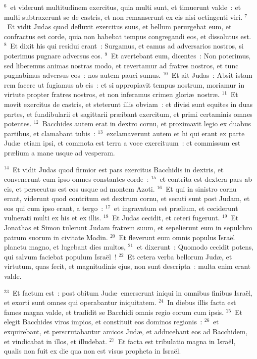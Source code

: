 ${}^{6}$~et viderunt multitudinem exercitus, quia multi sunt, et timuerunt valde~: et multi subtraxerunt se de castris, et non remanserunt ex eis nisi octingenti viri.
${}^{7}$~Et vidit Judas quod defluxit exercitus suus, et bellum perurgebat eum, et confractus est corde, quia non habebat tempus congregandi eos, et dissolutus est.
${}^{8}$~Et dixit his qui residui erant~: Surgamus, et eamus ad adversarios nostros, si poterimus pugnare adversus eos.
${}^{9}$~Et avertebant eum, dicentes~: Non poterimus, sed liberemus animas nostras modo, et revertamur ad fratres nostros, et tunc pugnabimus adversus eos~: nos autem pauci sumus.
${}^{10}$~Et ait Judas~: Absit istam rem facere ut fugiamus ab eis~: et si appropiavit tempus nostrum, moriamur in virtute propter fratres nostros, et non inferamus crimen glori\ae\ nostr\ae .
${}^{11}$~Et movit exercitus de castris, et steterunt illis obviam~: et divisi sunt equites in duas partes, et fundibularii et sagittarii pr\ae ibant exercitum, et primi certaminis omnes potentes.
${}^{12}$~Bacchides autem erat in dextro cornu, et proximavit legio ex duabus partibus, et clamabant tubis~:
${}^{13}$~exclamaverunt autem et hi qui erant ex parte Jud\ae\ etiam ipsi, et commota est terra a voce exercituum~: et commissum est pr\ae lium a mane usque ad vesperam.


${}^{14}$~Et vidit Judas quod firmior est pars exercitus Bacchidis in dextris, et convenerunt cum ipso omnes constantes corde~:
${}^{15}$~et contrita est dextera pars ab eis, et persecutus est eos usque ad montem Azoti.
${}^{16}$~Et qui in sinistro cornu erant, viderunt quod contritum est dextrum cornu, et secuti sunt post Judam, et eos qui cum ipso erant, a tergo~:
${}^{17}$~et ingravatum est pr\ae lium, et ceciderunt vulnerati multi ex his et ex illis.
${}^{18}$~Et Judas cecidit, et ceteri fugerunt.
${}^{19}$~Et Jonathas et Simon tulerunt Judam fratrem suum, et sepelierunt eum in sepulchro patrum suorum in civitate Modin.
${}^{20}$~Et fleverunt eum omnis populus Isra\"el planctu magno, et lugebant dies multos,
${}^{21}$~et dixerunt~: Quomodo cecidit potens, qui salvum faciebat populum Isra\"el~!
${}^{22}$~Et cetera verba bellorum Jud\ae , et virtutum, quas fecit, et magnitudinis ejus, non sunt descripta~: multa enim erant valde.


${}^{23}$~Et factum est~: post obitum Jud\ae\ emerserunt iniqui in omnibus finibus Isra\"el, et exorti sunt omnes qui operabantur iniquitatem.
${}^{24}$~In diebus illis facta est fames magna valde, et tradidit se Bacchidi omnis regio eorum cum ipsis.
${}^{25}$~Et elegit Bacchides viros impios, et constituit eos dominos regionis~:
${}^{26}$~et exquirebant, et perscrutabantur amicos Jud\ae , et adducebant eos ad Bacchidem, et vindicabat in illos, et illudebat.
${}^{27}$~Et facta est tribulatio magna in Isra\"el, qualis non fuit ex die qua non est visus propheta in Isra\"el.



